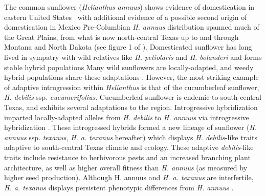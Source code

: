 \documentclass[11pt]{article}
\begin{document}
\begin{enumerate}
The common sunflower (\emph{Helianthus annuus}) shows evidence of domestication in eastern United States \cite{harter2004origin, wills2006chloroplast}\, with additional evidence of a possible second origin of domestication in Mexico \cite{lentz2008sunflower}\.
Pre-Columbian \emph{H. annuus} distribution spanned much of the Great Plains, from what is now north-central Texas up to and through Montana and North Dakota (see figure 1 of \cite{whitney2010adaptive}).
Domesticated sunflower has long lived in sympatry with wild relatives like \emph{H. petiolaris} and \emph{H. bolanderi} and forms stable hybrid populations \cite{schwarzbach2002likely, rieseberg1988molecular, welch2002patterns}\.
Many wild sunflowers are locally-adapted, and weedy hybrid populations share these adaptations \cite{kane2008genetics}.
However, the most striking example of adaptive introgression within \emph{Helianthus} is that of the cucumberleaf sunflower, \emph{H. debilis} ssp. \emph{cucumerifolius}.
Cucumberleaf sunflower is endemic to south-central Texas, and exhibits several adaptations to the region.
Introgressive hybridization imparted locally-adapted alleles from \emph{H. debilis} to \emph{H. annuus} via introgressive hybridization \cite{heiser1951hybridization}. 
These introgressed hybrids formed a new lineage of sunflower (\emph{H. annuus} ssp. \emph{texanus}, \emph{H. a. texanus} hereafter) which displays \emph{H. debilis}-like traits adaptive to south-central Texas climate and ecology.
These adaptive \emph{debilis}-like traits include resistance to herbivorous pests and an increased branching plant architecture, as well as higher overall fitness than \emph{H. annuus} (as measured by higher seed production)\cite{whitney2006adaptive}.
Although H. annuus and \emph{H. a. texanus} are interfertile, \emph{H. a. texanus} displays persistent phenotypic differences from \emph{H. annuus} \cite{rieseberg2007hybridization}.



\end{enumerate}
\end{document}
